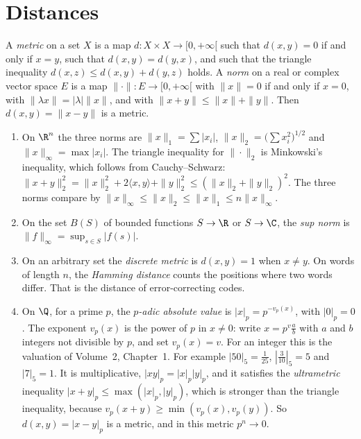 \section{Distances}

\begin{definition}
A \emph{metric} on a set $X$ is a map $d:X\times X\to[0,+\infty[$ such that $d(x,y)=0$ if and only if $x=y$, such that $d(x,y)=d(y,x)$, and such that the triangle inequality $d(x,z)\le d(x,y)+d(y,z)$ holds. A \emph{norm} on a real or complex vector space $E$ is a map $\|\cdot\|:E\to[0,+\infty[$ with $\|x\|=0$ if and only if $x=0$, with $\|\lambda x\|=|\lambda|\|x\|$, and with $\|x+y\|\le\|x\|+\|y\|$. Then $d(x,y)=\|x-y\|$ is a metric.
\end{definition}

\begin{example}\label{ex:metrics}
\begin{enumerate}[label=(\alph*)]
\item On $\R^n$ the three norms are $\|x\|_1=\sum|x_i|$, $\|x\|_2=\bigl(\sum x_i^2\bigr)^{1/2}$ and $\|x\|_\infty=\max|x_i|$. The triangle inequality for $\|\cdot\|_2$ is Minkowski's inequality, which follows from Cauchy--Schwarz: $\|x+y\|_2^2=\|x\|_2^2+2\langle x,y\rangle+\|y\|_2^2\le(\|x\|_2+\|y\|_2)^2$. The three norms compare by $\|x\|_\infty\le\|x\|_2\le\|x\|_1\le n\|x\|_\infty$.
\item On the set $B(S)$ of bounded functions $S\to\R$ or $S\to\C$, the \emph{sup norm} is $\|f\|_\infty=\sup_{s\in S}|f(s)|$.
\item On an arbitrary set the \emph{discrete metric} is $d(x,y)=1$ when $x\ne y$. On words of length $n$, the \emph{Hamming distance} counts the positions where two words differ. That is the distance of error-correcting codes.
\item On $\Q$, for a prime $p$, the \emph{$p$-adic absolute value} is $|x|_p=p^{-v_p(x)}$, with $|0|_p=0$. The exponent $v_p(x)$ is the power of $p$ in $x\ne0$: write $x=p^v\frac ab$ with $a$ and $b$ integers not divisible by $p$, and set $v_p(x)=v$. For an integer this is the valuation of Volume~2, Chapter~1. For example $|50|_5=\frac1{25}$, $|\frac3{10}|_5=5$ and $|7|_5=1$. It is multiplicative, $|xy|_p=|x|_p|y|_p$, and it satisfies the \emph{ultrametric} inequality $|x+y|_p\le\max(|x|_p,|y|_p)$, which is stronger than the triangle inequality, because $v_p(x+y)\ge\min(v_p(x),v_p(y))$. So $d(x,y)=|x-y|_p$ is a metric, and in this metric $p^n\to0$.
\end{enumerate}
\end{example}

